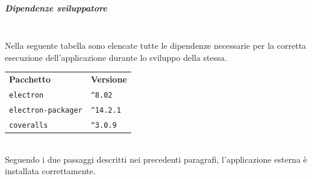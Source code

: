 \subparagraph*{Dipendenze sviluppatore}\mbox{}\\ [1mm]
Nella seguente tabella sono elencate tutte le dipendenze necessarie per la corretta esecuzione dell'applicazione durante lo sviluppo della stessa.
	\setcounter{table}{0}
	\begin{longtable} {
		>{}p{65mm} 
		>{}p{30mm}
		}
    \rowcolor{gray!50}
    \textbf{Pacchetto} & \textbf{Versione} \TBstrut \\ [2mm]
    \verb|electron| & \verb|^8.02| \TBstrut \\ [2mm]
    \verb|electron-packager| & \verb|^14.2.1| \TBstrut \\ [2mm]
    \verb|coveralls| & \verb|^3.0.9| \TBstrut \\ [2mm]
    \end{longtable}
    \mbox{}\\ [1mm]
Seguendo i due passaggi descritti nei precedenti paragrafi, l'applicazione esterna è installata correttamente.
